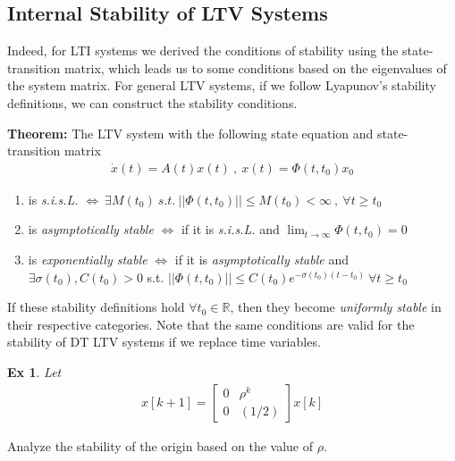 \documentclass[twoside, 11pt]{article}
\newtheorem{exmp}[theorem]{Ex}
\begin{document}
\subsection{Internal Stability of LTV Systems}

Indeed, for LTI systems we derived the conditions of stability using the state-transition matrix, 
which leads us to some conditions based on the eigenvalues of the system matrix. For general LTV systems,
if we follow Lyapunov's stability definitions, we can construct the stability conditions.

\textbf{Theorem:} The LTV system with the following state equation and state-transition matrix
%
\begin{align*}
 \dot{x}(t) = A(t) x(t) \ , \ x(t) = \Phi(t,t_0) x_0
\end{align*}
%
\begin{enumerate}
\item is \textit{s.i.s.L.} $\iff \ \exists M(t_0) \ s.t. \ || \Phi(t,t_0) || \leq M(t_0) < \infty \ , \ \forall t \geq t_0$
\item is \textit{asymptotically stable} $\iff$ if it is \textit{s.i.s.L.} and $ \lim_{t \to \infty} \Phi(t,t_0) = 0$
\item is \textit{exponentially stable} $\iff$ if it is \textit{asymptotically stable} and 
$\exists \sigma(t_0) , C(t_0) > 0$ s.t. $ || \Phi(t,t_0) || \leq C(t_0) e^{-\sigma(t_0) (t - t_0)} \ \forall t \geq t_0$
\end{enumerate}
% 
If these stability definitions hold $\forall t_0 \in \mathbb{R}$, then they become \textit{uniformly stable} in their respective 
categories. Note that the same conditions are valid for the stability of DT LTV systems if we replace time variables. 

\begin{exmp}
 Let 
 \begin{align*}
  x[k+1] = \begin{bmatrix} 0 & \rho^k  \\ 0 & (1/2) \end{bmatrix} x[k]
 \end{align*}
\end{exmp}
Analyze the stability of the origin based on the value of $\rho$.
\end{document}
